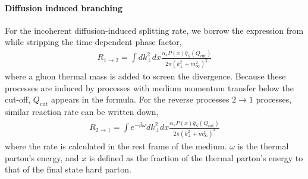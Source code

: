 \paragraph{Diffusion induced branching} For the incoherent diffusion-induced splitting rate, we borrow the expression from \cite{Cao:2017hhk} while stripping the time-dependent phase factor,
\begin{eqnarray}
R_{1\rightarrow 2} = \int d k_\perp^2 dx \frac{\alpha_s P(x) \hat{q}_S(Q_{\textrm{cut}})}{2\pi (k_\perp^2 + m_\infty^2)^2}
\end{eqnarray}
where a gluon thermal mass is added to screen the divergence.
Because these processes are induced by processes with medium momentum transfer below the cut-off, $Q_{\textrm{cut}}$ appears in the formula.
For the reverse processes $2\rightarrow 1$ processes, similar reaction rate can be written down,
\begin{eqnarray}
R_{2\rightarrow 1} = \int e^{-\beta \omega} d k_\perp^2 dx \frac{\alpha_s P(x) \hat{q}_S(Q_{\textrm{cut}})}{2\pi (k_\perp^2 + m_\infty^2)^2} 
\end{eqnarray}
where the rate is calculated in the rest frame of the medium. $\omega$ is the thermal parton's energy, and $x$ is defined as the fraction of the thermal parton's energy to that of the final state hard parton.

